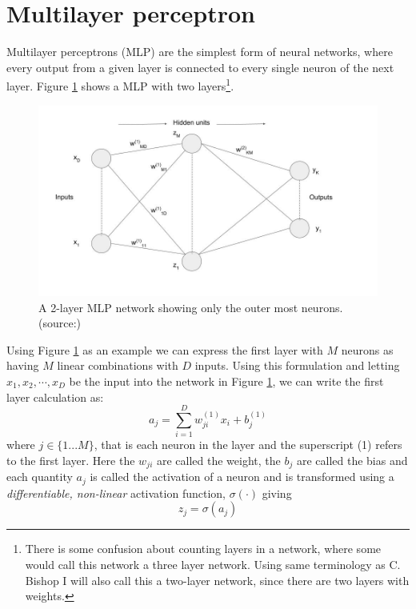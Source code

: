 \section{Multilayer perceptron}
\label{sec:mlp}
Multilayer perceptrons (MLP) are the simplest form of neural networks, where
every output from a given layer is connected to every single neuron of the next
layer. Figure \ref{fig:mlp2} shows a MLP with two layers\footnote{There is some
	confusion about counting layers in a network, where some would call this network
	a three layer network. Using same terminology as C. Bishop I will also call this
	a two-layer network, since there are two layers with weights.}. 
\begin{figure}[!htbp]
	\centering 
	\includegraphics[width=\textwidth]{pics/nn}
	\caption{A 2-layer MLP network showing only the outer most neurons.
		(source:\cite[ch. 5]{Bishop:2006:PRM:1162264})}
	\label{fig:mlp2}
\end{figure}\newline 
Using Figure \ref{fig:mlp2} as an example we can express the first layer with
$M$ neurons as having $M$ linear combinations with $D$ inputs. Using this
formulation and letting $x_1, x_2,  \cdots, x_D$ be the input into the network
in Figure \ref{fig:mlp2}, we can write the first layer calculation as:
\begin{equation}
\label{eq:layer1}
a_j = \sum_{i=1}^{D} w_{ji}^{(1)}x_i + b^{(1)}_{j} 
\end{equation}
where $j \in \{1...M\}$, that is each neuron in the layer and the superscript
(1) refers to the first layer. Here the $w_{ji}$ are called the weight, the
$b_{j}$ are called the bias and each quantity $a_j$ is called the activation of
a neuron and is transformed using a \emph{differentiable, non-linear} activation
function, $\sigma(\cdot)$ giving
\begin{equation}
\label{eq:layer1act}
z_j = \sigma(a_j)
\end{equation}
